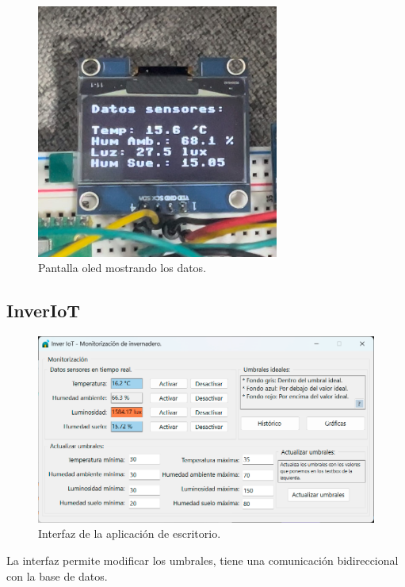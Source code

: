 \begin{figure}[h]
\centering
\includegraphics[width=0.71\textwidth]{img/fotos/oled1.png}
\caption{Pantalla oled mostrando los datos.}
\end{figure}

\subsection{InverIoT}

\begin{figure}[h]
\centering
\includegraphics[width=1\textwidth]{img/desarrollo/InverIoT_Desktop.png}
\caption{Interfaz de la aplicación de escritorio.}
\end{figure}

La interfaz permite modificar los umbrales, tiene una comunicación bidireccional con la base de datos.

